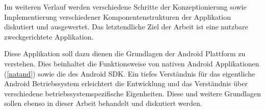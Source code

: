Im weiteren Verlauf werden verschiedene Schritte der Konzeptionierung sowie Implementierung verschiedener Komponentenstrukturen der Applikation diskutiert und ausgewertet. Das letztendliche Ziel der Arbeit ist eine nutzbare zweckgerichtete Applikation.

Diese Applikation soll dazu dienen die Grundlagen der Android Plattform zu verstehen. Dies beinhaltet die Funktionsweise von nativen Android Applikationen (\ref{natand}) sowie die des Android SDK. Ein tiefes Verständnis für das eigentliche Android Betriebssystem erleichtert die Entwicklung und das Verständnis über verschiedene betriebssystemspezifische Eigenheiten. Diese und weitere Grundlagen sollen ebenso in dieser Arbeit behandelt und diskutiert werden.